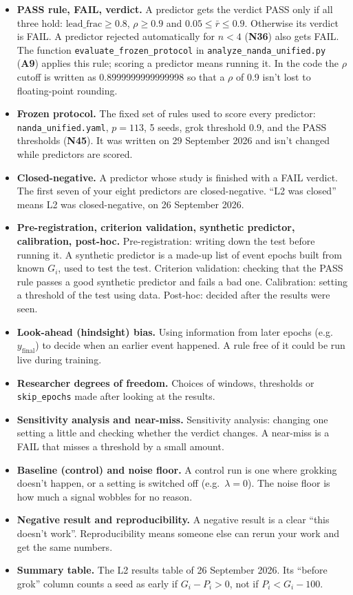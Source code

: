 \documentclass[11pt,a4paper,oneside,openany]{report}
\newcommand{\leadfrac}{\mathrm{lead\_frac}}
\newcommand{\rbar}{\bar{r}}
\newcommand{\yfinal}{y_{\mathrm{final}}}
\newcommand{\code}[1]{\texttt{#1}}
\newcommand{\gl}[1]{\textbf{#1}}   %
\newenvironment{glist}{\begin{itemize}\setlength{\itemsep}{2pt}\setlength{\parskip}{1pt}}{\end{itemize}}
\begin{document}
\begin{glist}
\item[\gl{N45}] \textbf{PASS rule, FAIL, verdict.} A predictor gets the verdict PASS only if all three hold: $\leadfrac \ge 0.8$, $\rho \ge 0.9$ and $0.05 \le \rbar \le 0.9$. Otherwise its verdict is FAIL. A predictor rejected automatically for $n < 4$ (\gl{N36}) also gets FAIL. The function \code{evaluate\_\allowbreak{}frozen\_\allowbreak{}protocol} in \code{analyze\_\allowbreak{}nanda\_\allowbreak{}unified.py} (\gl{A9}) applies this rule; scoring a predictor means running it. In the code the $\rho$ cutoff is written as 0.8999999999999998 so that a $\rho$ of 0.9 isn't lost to floating-point rounding.
\item[\gl{N46}] \textbf{Frozen protocol.} The fixed set of rules used to score every predictor: \code{nanda\_\allowbreak{}unified.yaml}, $p = 113$, 5 seeds, grok threshold 0.9, and the PASS thresholds (\gl{N45}). It was written on 29 September 2026 and isn't changed while predictors are scored.
\item[\gl{N47}] \textbf{Closed-negative.} A predictor whose study is finished with a FAIL verdict. The first seven of your eight predictors are closed-negative. ``L2 was closed'' means L2 was closed-negative, on 26 September 2026.
\item[\gl{N48}] \textbf{Pre-registration, criterion validation, synthetic predictor, calibration, post-hoc.} Pre-registration: writing down the test before running it. A synthetic predictor is a made-up list of event epochs built from known $G_i$, used to test the test. Criterion validation: checking that the PASS rule passes a good synthetic predictor and fails a bad one. Calibration: setting a threshold of the test using data. Post-hoc: decided after the results were seen.
\item[\gl{N49}] \textbf{Look-ahead (hindsight) bias.} Using information from later epochs (e.g.\ $\yfinal$) to decide when an earlier event happened. A rule free of it could be run live during training.
\item[\gl{N50}] \textbf{Researcher degrees of freedom.} Choices of windows, thresholds or \code{skip\_\allowbreak{}epochs} made after looking at the results.
\item[\gl{N51}] \textbf{Sensitivity analysis and near-miss.} Sensitivity analysis: changing one setting a little and checking whether the verdict changes. A near-miss is a FAIL that misses a threshold by a small amount.
\item[\gl{N52}] \textbf{Baseline (control) and noise floor.} A control run is one where grokking doesn't happen, or a setting is switched off (e.g.\ $\lambda = 0$). The noise floor is how much a signal wobbles for no reason.
\item[\gl{N53}] \textbf{Negative result and reproducibility.} A negative result is a clear ``this doesn't work''. Reproducibility means someone else can rerun your work and get the same numbers.
\item[\gl{N54}] \textbf{Summary table.} The L2 results table of 26 September 2026. Its ``before grok'' column counts a seed as early if $G_i - P_i > 0$, not if $P_i < G_i - 100$.
\end{glist}
\end{document}
